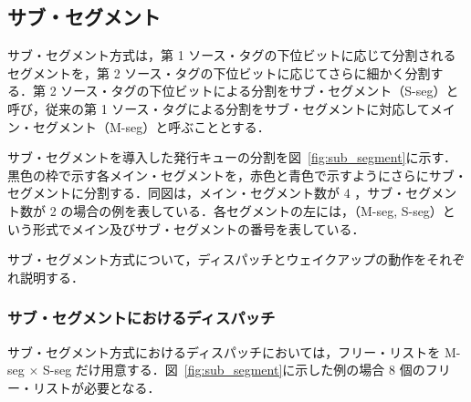 \documentclass[submit,techrep,noauthor]{ipsj}
\newcommand{\fig}[1]{{図~\ref{fig:#1}}}
\begin{document}
\subsection{サブ・セグメント}
\label{sec:sub_segment}
サブ・セグメント方式は，第 1 ソース・タグの下位ビットに応じて分割されるセグメントを，第 2 ソース・タグの下位ビットに応じてさらに細かく分割する．第 2 ソース・タグの下位ビットによる分割をサブ・セグメント（S-seg）と呼び，従来の第 1 ソース・タグによる分割をサブ・セグメントに対応してメイン・セグメント（M-seg）と呼ぶこととする．

サブ・セグメントを導入した発行キューの分割を\fig{sub_segment}に示す．黒色の枠で示す各メイン・セグメントを，赤色と青色で示すようにさらにサブ・セグメントに分割する．同図は，メイン・セグメント数が 4 ，サブ・セグメント数が 2 の場合の例を表している．各セグメントの左には，（M-seg, S-seg）という形式でメイン及びサブ・セグメントの番号を表している．

サブ・セグメント方式について，ディスパッチとウェイクアップの動作をそれぞれ説明する．

\subsubsection{サブ・セグメントにおけるディスパッチ}
サブ・セグメント方式におけるディスパッチにおいては，フリー・リストを M-seg $\times$ S-seg だけ用意する．\fig{sub_segment}に示した例の場合 8 個のフリー・リストが必要となる．
\end{document}
